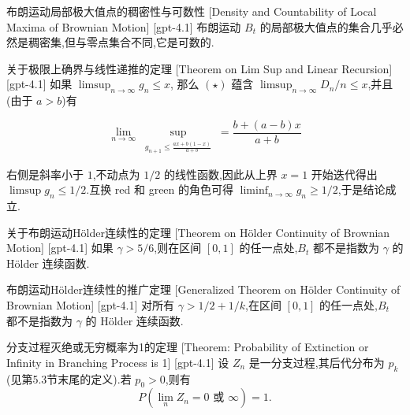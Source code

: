 \documentclass[UTF8]{ctexart}
\begin{document}
    
    
    \begin{thm}
        {布朗运动局部极大值点的稠密性与可数性}
        [Density and Countability of Local Maxima of Brownian Motion]
        [gpt-4.1]
        布朗运动 $B_t$ 的局部极大值点的集合几乎必然是稠密集,但与零点集合不同,它是可数的.
    \end{thm}
    
    
    
    \begin{thm}
        {关于极限上确界与线性递推的定理}
        [Theorem on Lim Sup and Linear Recursion]
        [gpt-4.1]
        如果 $\limsup_{n \to \infty} g_n \le x$, 那么 $( { \star } )$ 蕴含 $\limsup_{n \to \infty} D_n / n \le x$,并且(由于 $a > b$)有

\[
\lim_{n \to \infty} \sup_{\substack{g_{n+1} \leq \frac{a x + b ( 1 - x )}{a + b}}} = \frac{b + (a - b)x}{a + b}
\]

右侧是斜率小于 $1$,不动点为 $1/2$ 的线性函数,因此从上界 $x=1$ 开始迭代得出 $\limsup g_n \leq 1 / 2$.互换 red 和 green 的角色可得 $\liminf_{n \to \infty} g_n \geq 1 / 2$,于是结论成立.

    \end{thm}
    
    
    
    \begin{thm}
        {关于布朗运动Hölder连续性的定理}
        [Theorem on Hölder Continuity of Brownian Motion]
        [gpt-4.1]
        如果 $\gamma > 5/6$,则在区间 $[0,1]$ 的任一点处,$B_t$ 都不是指数为 $\gamma$ 的 Hölder 连续函数.
    \end{thm}
    
    
    
    \begin{thm}
        {布朗运动Hölder连续性的推广定理}
        [Generalized Theorem on Hölder Continuity of Brownian Motion]
        [gpt-4.1]
        对所有 $\gamma > 1/2 + 1/k$,在区间 $[0,1]$ 的任一点处,$B_t$ 都不是指数为 $\gamma$ 的 Hölder 连续函数.
    \end{thm}
    
    
    
    \begin{thm}
        {分支过程灭绝或无穷概率为1的定理}
        [Theorem: Probability of Extinction or Infinity in Branching Process is 1]
        [gpt-4.1]
        设 $Z_{n}$ 是一分支过程,其后代分布为 $p_{k}$(见第5.3节末尾的定义).若 $p_{0} > 0$,则有
\[
P\left( \lim_{n} Z_{n} = 0 \text{ 或 } \infty \right) = 1.
\]

    \end{thm}
    
\end{document}

